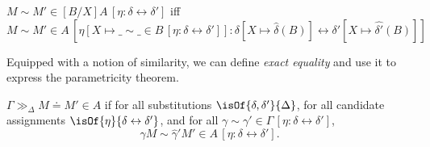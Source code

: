 \documentclass{article}
\newcommand{\rsim}[6]{#1 \sim #2 \in #3 \, [#4 : #5 \leftrightarrow #6]}
\newcommand{\exeq}[5]{#1 \gg_#2 #3 \doteq #4 \in #5}
\begin{document}
\begin{definition}[Compositionality]
$\rsim{M}{M'}{[B/X]A}{\eta}{\delta}{\delta'}$ iff $\rsim{M}{M'}{A}{\eta[X\mapsto \rsim{\_}{\_}{B}{\eta}{\delta}{\delta'}]}{\delta[X \mapsto \hat{\delta}(B)]}{\delta'[X \mapsto \hat{\delta'}(B)]}$
\end{definition}

Equipped with a notion of similarity, we can define \emph{exact equality} and use it to express the parametricity theorem.
\begin{definition}
    $\exeq{\Gamma}{\Delta}{M}{M'}{A}$ if for all substitutions $\isOf{\delta, \delta'}{\Delta}$, for all candidate assignments $\isOf{\eta}{\delta\leftrightarrow\delta'}$, and for all $\rsim{\gamma}{\gamma'}{\Gamma}{\eta}{\delta}{\delta'}$, \[\rsim{\hat{\gamma}M}{\hat{\gamma}'M'}{A}{\eta}{\delta}{\delta'}.\]
\end{definition}
\end{document}
